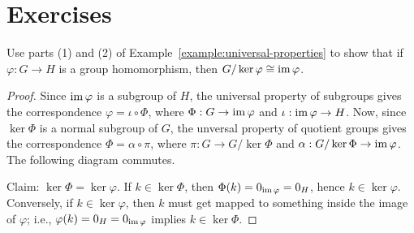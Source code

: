 \section*{\centering Exercises}
    \begin{exercise}
        Use parts (1) and (2) of Example~\ref{example:universal-properties} to show that if $\varphi:G \rightarrow H$ is a group homomorphism, then $G/\ker{\varphi} \cong \operatorname{im}{\varphi}$.
    \end{exercise}
        {\color{red} \begin{proof}
            Since $\operatorname{im}{\varphi}$ is a subgroup of $H$, the universal property of subgroups gives the correspondence $\varphi = \iota \circ \Phi$, where $\Phi : G \rightarrow \operatorname{im}{\varphi}$ and $\iota: \operatorname{im}{\varphi} \rightarrow H$. Now, since $\ker{\Phi}$ is a normal subgroup of $G$, the unversal property of quotient groups gives the correspondence $\Phi = \alpha \circ \pi$, where $\pi : G \rightarrow G/\ker{\Phi}$ and $\alpha: G/\ker{\Phi} \rightarrow \operatorname{im}{\varphi}$. The following diagram commutes.

                \begin{center}
                \end{center}
            
            Claim: $\ker{\Phi} = \ker{\varphi}$. If $k \in \ker{\Phi}$, then $\Phi(k) = 0_{\operatorname{im}{\varphi}} = 0_H$, hence $k \in \ker{\varphi}$. Conversely, if $k \in \ker{\varphi}$, then $k$ must get mapped to something inside the image of $\varphi$; i.e., $\varphi(k) = 0_H = 0_{\operatorname{im}{\varphi}}$ implies $ k \in \ker{\Phi}$.


\end{proof}}
